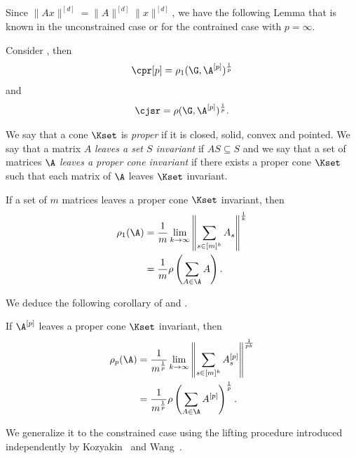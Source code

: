 \documentclass[11pt,twoside,a4paper,openright]{uclouvain-thesis}
\begin{document}
Since $\|Ax\|^{[d]} = \|A\|^{[d]}\|x\|^{[d]}$, we have the following
Lemma that is known in the unconstrained case or for the contrained
case with $p=\infty$.
\begin{mylem}
  \label{lem:pp}
  Consider , then
  \[ \cpr[p] = \rho_1(\G,\A^{[p]})^{\frac{1}{p}} \]
  and
  \[ \cjsr = \rho(\G,\A^{[p]})^{\frac{1}{p}}. \]
\end{mylem}

We say that a cone $\Kset$ is \emph{proper} if it is closed, solid, convex and pointed.
We say that a matrix $A$ \emph{leaves a set $S$ invariant} if $AS \subseteq S$ and
we say that a set of matrices $\A$ \emph{leaves a proper cone invariant} if there
exists a proper cone $\Kset$ such that each matrix of $\A$ leaves $\Kset$ invariant.

\begin{mylem}
  \label{lem:unconstrainedinv}
  If a set of $m$ matrices leaves a proper cone $\Kset$ invariant, then
  \begin{align*}
    \rho_1(\A)
    & = \frac{1}{m}\lim_{k\to\infty} \left\|\sum_{s \in [m]^k}A_s\right\|^{\frac{1}{k}}\\
    & = \frac{1}{m}\rho\left(\sum_{A \in \A}A\right).
  \end{align*}
\end{mylem}


We deduce the following corollary of  and
.
\begin{mycoro}
  If $\A^{[p]}$ leaves a proper cone $\Kset$ invariant, then
  \begin{align*}
    \rho_p(\A)
    & = \frac{1}{m^{\frac{1}{p}}}\lim_{k\to\infty} \left\|\sum_{s \in [m]^k}A_s^{[p]}\right\|^{\frac{1}{pk}}\\
    & = \frac{1}{m^{\frac{1}{p}}}\rho\left(\sum_{A \in \A}A^{[p]}\right)^{\frac{1}{p}}.
  \end{align*}
\end{mycoro}


We generalize it to the constrained case using the lifting procedure
introduced independently by Kozyakin~\cite{kozyakin2014berger} and Wang~\cite{wang2014stability}.
\end{document}
